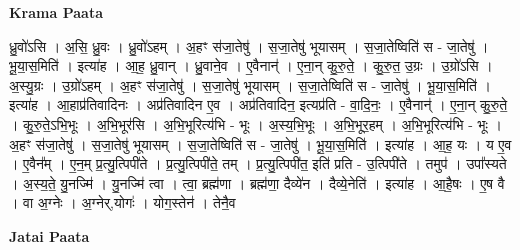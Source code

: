 \documentclass[17pt]{extarticle}
\begin{document}
\textbf{Krama Paata} \newline

ध्रु॒वो॑ऽसि । अ॒सि॒ ध्रु॒वः । ध्रु॒वो॑ऽहम् । अ॒हꣳ स॑जा॒तेषु॑ । स॒जा॒तेषु॑ भूयासम् । स॒जा॒तेष्विति॑ स - जा॒तेषु॑ । भू॒या॒स॒मिति॑ । इत्या॑ह । आ॒ह॒ ध्रु॒वान् । ध्रु॒वाने॒व । ए॒वैनान्॑ । ए॒ना॒न् कु॒रु॒ते॒ । कु॒रु॒त॒ उ॒ग्रः । उ॒ग्रो॑ऽसि । अ॒स्यु॒ग्रः । उ॒ग्रो॑ऽहम् । अ॒हꣳ स॑जा॒तेषु॑ । स॒जा॒तेषु॑ भूयासम् । स॒जा॒तेष्विति॑ स - जा॒तेषु॑ । भू॒या॒स॒मिति॑ । इत्या॑ह । आ॒हाप्र॑तिवादिनः । अप्र॑तिवादिन ए॒व । अप्र॑तिवादिन॒ इत्यप्र॑ति - वा॒दि॒नः॒ । ए॒वैनान्॑ । ए॒ना॒न् कु॒रु॒ते॒ । कु॒रु॒ते॒ऽभि॒भूः । अ॒भि॒भूर॑सि । अ॒भि॒भूरित्य॑भि - भूः । अ॒स्य॒भि॒भूः । अ॒भि॒भूर॒हम् । अ॒भि॒भूरित्य॑भि - भूः । अ॒हꣳ स॑जा॒तेषु॑ । स॒जा॒तेषु॑ भूयासम् । स॒जा॒तेष्विति॑ स - जा॒तेषु॑ । भू॒या॒स॒मिति॑ । इत्या॑ह । आ॒ह॒ यः । य ए॒व । ए॒वैन᳚म् । ए॒न॒म् प्र॒त्यु॒त्पिपी॑ते । प्र॒त्यु॒त्पिपी॑ते॒ तम् । प्र॒त्यु॒त्पिपी॑त॒ इति॑ प्रति - उ॒त्पिपी॑ते । तमुप॑ । उपा᳚स्यते । अ॒स्य॒ते॒ यु॒नज्मि॑ । यु॒नज्मि॑ त्वा । त्वा॒ ब्रह्म॑णा । ब्रह्म॑णा॒ दैव्ये॑न । दैव्ये॒नेति॑ । इत्या॑ह । आ॒है॒षः । ए॒ष वै । वा अ॒ग्नेः । अ॒ग्नेर्,योगः॑ । योग॒स्तेन॑ । तेनै॒व \newline

\textbf{Jatai Paata} \newline
\end{document}
